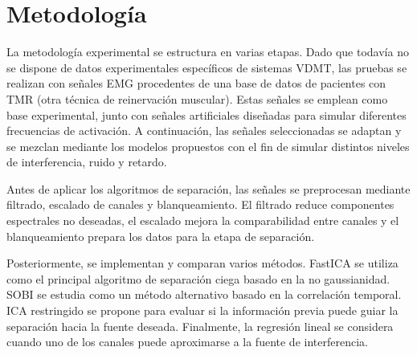 \section*{Metodología}

La metodología experimental se estructura en varias etapas. Dado que todavía no se dispone de datos experimentales específicos de sistemas VDMT, las pruebas se realizan con señales EMG procedentes de una base de datos de pacientes con TMR (otra técnica de reinervación muscular). Estas señales se emplean como base experimental, junto con señales artificiales diseñadas para simular diferentes frecuencias de activación. A continuación, las señales seleccionadas se adaptan y se mezclan mediante los modelos propuestos con el fin de simular distintos niveles de interferencia, ruido y retardo.

Antes de aplicar los algoritmos de separación, las señales se preprocesan mediante filtrado, escalado de canales y blanqueamiento. El filtrado reduce componentes espectrales no deseadas, el escalado mejora la comparabilidad entre canales y el blanqueamiento prepara los datos para la etapa de separación.

Posteriormente, se implementan y comparan varios métodos. FastICA se utiliza como el principal algoritmo de separación ciega basado en la no gaussianidad. SOBI se estudia como un método alternativo basado en la correlación temporal. ICA restringido se propone para evaluar si la información previa puede guiar la separación hacia la fuente deseada. Finalmente, la regresión lineal se considera cuando uno de los canales puede aproximarse a la fuente de interferencia.

